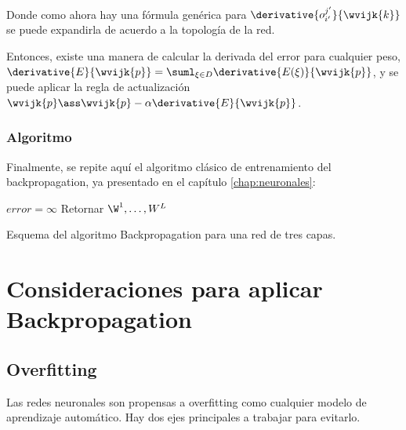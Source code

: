 Donde como ahora hay una fórmula genérica para $\derivative{ o_{i'}^{j'} }{\wvijk{k}}$ se puede expandirla de acuerdo a la topología de la red.

Entonces, existe una manera de calcular la derivada del error para cualquier peso, $\derivative{E}{\wvijk{p}}= \suml_{\xi \in D} \derivative{E(\xi)}{\wvijk{p}}$, y se puede aplicar la regla de actualización $\wvijk{p} \ass\wvijk{p} - \alpha \derivative{E}{\wvijk{p}}$.
 
 
\subsubsection{Algoritmo}
 
Finalmente, se repite aquí el algoritmo clásico de entrenamiento del backpropagation, ya presentado en el capítulo \ref{chap:neuronales}:


\begin{algorithm}[H]
$error=\infty$ \;
Retornar  $\W^1,\dots,W^L$ \;
\caption{Esquema del algoritmo Backpropagation para una red de tres capas.} 
\end{algorithm}
\vspace{10pt}


\section{Consideraciones para aplicar Backpropagation}

\subsection{Overfitting}

Las redes neuronales son propensas a overfitting como cualquier modelo de aprendizaje automático. Hay dos ejes principales a trabajar para evitarlo.


